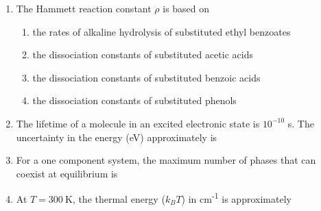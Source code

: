 \documentclass[12pt]{article}
\begin{document}
\begin{enumerate}
    \item The Hammett reaction constant $\rho$ is based on
    \begin{enumerate}
    \item  the rates of alkaline hydrolysis of substituted ethyl benzoates
    \item  the dissociation constants of substituted acetic acids
    \item  the dissociation constants of substituted benzoic acids
    \item  the dissociation constants of substituted phenols    \hfill{}
    \end{enumerate}


    

    \item The lifetime of a molecule in an excited electronic state is $10^{-10}$ s. The uncertainty in the energy (eV) approximately is
    \begin{enumerate}
 \hfill{}
\end{enumerate}
    

    \item For a one component system, the maximum number of phases that can coexist at equilibrium is
    \begin{enumerate}
\end{enumerate}
    

    \item At $T = 300 \ \mathrm{K}$, the thermal energy ($k_B T$) in cm\textsuperscript{-1} is approximately
    \begin{enumerate}
\end{enumerate}


\end{enumerate}
\end{document}

